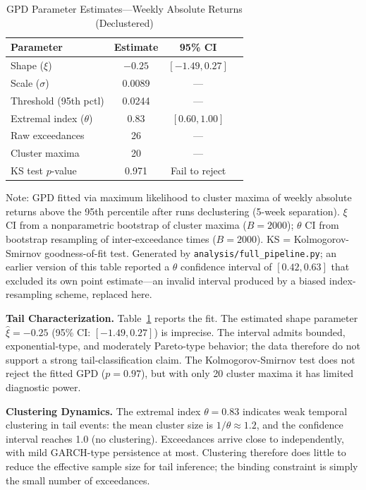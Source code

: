 \documentclass[11pt]{article}
\begin{document}
\begin{table}[H]
\centering
\caption{GPD Parameter Estimates---Weekly Absolute Returns (Declustered)}
\label{tab:gpd}
\small
\begin{tabular}{@{}lccc@{}}
\toprule
Parameter & Estimate & 95\% CI \\
\midrule
Shape ($\xi$) & $-0.25$ & $[-1.49, 0.27]$ \\
Scale ($\sigma$) & 0.0089 & --- \\
Threshold (95th pctl) & 0.0244 & --- \\
Extremal index ($\theta$) & 0.83 & $[0.60, 1.00]$ \\
Raw exceedances & 26 & --- \\
Cluster maxima & 20 & --- \\
KS test $p$-value & 0.971 & Fail to reject \\
\bottomrule
\end{tabular}
\par\vspace{0.3em}
\parbox{\linewidth}{\footnotesize Note: GPD fitted via maximum likelihood to cluster maxima of weekly absolute returns above the 95th percentile after runs declustering (5-week separation). $\xi$ CI from a nonparametric bootstrap of cluster maxima ($B = 2000$); $\theta$ CI from bootstrap resampling of inter-exceedance times ($B = 2000$). KS = Kolmogorov-Smirnov goodness-of-fit test. Generated by \texttt{analysis/full\_pipeline.py}; an earlier version of this table reported a $\theta$ confidence interval of $[0.42, 0.63]$ that excluded its own point estimate---an invalid interval produced by a biased index-resampling scheme, replaced here.}
\end{table}

\textbf{Tail Characterization.} Table~\ref{tab:gpd} reports the fit. The estimated shape parameter $\hat{\xi} = -0.25$ (95\% CI: $[-1.49, 0.27]$) is imprecise. The interval admits bounded, exponential-type, and moderately Pareto-type behavior; the data therefore do not support a strong tail-classification claim. The Kolmogorov-Smirnov test does not reject the fitted GPD ($p = 0.97$), but with only 20 cluster maxima it has limited diagnostic power.

\textbf{Clustering Dynamics.} The extremal index $\theta = 0.83$ indicates weak temporal clustering in tail events: the mean cluster size is $1/\theta \approx 1.2$, and the confidence interval reaches 1.0 (no clustering). Exceedances arrive close to independently, with mild GARCH-type persistence \citep{bollerslev1986generalized} at most. Clustering therefore does little to reduce the effective sample size for tail inference; the binding constraint is simply the small number of exceedances.
\end{document}
